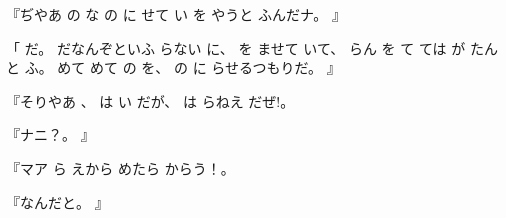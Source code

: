 『ぢやあ
の
な
の
に
せて
い
を
やうと
ふんだナ。
』

「
だ。
だなんぞといふ
らない
に、
を
ませて
いて、
らん
を
て
ては
が
たんと
ふ。
めて
めて
の
を、
の
に
らせるつもりだ。
』

『そりやあ
、
は
い
だが、
は
らねえ
だぜ!。

『ナニ？。
』

『マア
ら
えから
めたら
からう！。

『なんだと。
』

